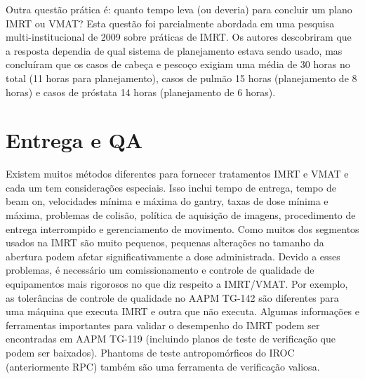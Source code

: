 \documentclass[11pt,a4paper]{article}
\newcounter{exemplo}
\begin{document}
	Outra questão prática é: quanto tempo leva (ou deveria) para concluir um plano IMRT ou VMAT? Esta questão foi parcialmente abordada em uma pesquisa multi-institucional de 2009 sobre práticas de IMRT. Os autores descobriram que a resposta dependia de qual sistema de planejamento estava sendo usado, mas concluíram que os casos de cabeça e pescoço exigiam uma média de 30 horas no total (11 horas para planejamento), casos de pulmão 15 horas (planejamento de 8 horas) e casos de próstata 14 horas (planejamento de 6 horas).
	
\section{Entrega e QA}

	Existem muitos métodos diferentes para fornecer tratamentos IMRT e VMAT e cada um tem considerações especiais. Isso inclui tempo de entrega, tempo de beam on,  velocidades mínima e máxima do gantry, taxas de dose mínima e máxima, problemas de colisão, política de aquisição  de imagens, procedimento de entrega interrompido e gerenciamento de movimento. Como muitos dos segmentos usados na IMRT são muito pequenos, pequenas alterações no tamanho da abertura podem afetar significativamente a dose administrada. Devido a esses problemas, é necessário um comissionamento e controle de qualidade de equipamentos mais rigorosos no que diz respeito a IMRT/VMAT. Por exemplo, as tolerâncias de controle de qualidade no AAPM TG-142 são diferentes para uma máquina que executa IMRT e outra que não executa. Algumas informações e ferramentas importantes para validar o desempenho do IMRT podem ser encontradas em AAPM TG-119 (incluindo planos de teste de verificação que podem ser baixados). Phantoms de teste antropomórficos do IROC (anteriormente RPC) também são uma ferramenta de verificação valiosa.



\end{document}
